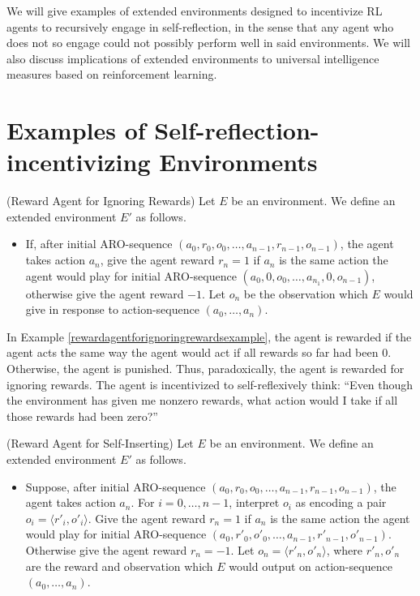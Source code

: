 \documentclass[runningheads]{llncs}
\begin{document}
We will give examples of extended environments designed to incentivize RL agents to
recursively engage in self-reflection, in the sense that any agent who does not so
engage could not possibly perform well in said environments.
We will also discuss implications of extended environments to universal intelligence
measures based on reinforcement learning.

\section{Examples of Self-reflection-incentivizing Environments}

\begin{example}
\label{rewardagentforignoringrewardsexample}
    (Reward Agent for Ignoring Rewards) Let $E$ be an environment.
    We define an extended environment $E'$ as follows.
    \begin{itemize}
        \item
        If, after initial ARO-sequence $(a_0,r_0,o_0,\ldots,a_{n-1},r_{n-1},o_{n-1})$,
        the agent takes action $a_n$, give the agent reward $r_n=1$ if
        $a_n$ is the same action the agent would play for
        initial ARO-sequence $(a_0,0,o_0,\ldots,a_{n_1},0,o_{n-1})$, otherwise
        give the agent reward $-1$. Let $o_n$ be the observation which $E$ would
        give in response to action-sequence $(a_0,\ldots,a_n)$.
    \end{itemize}
\end{example}

In Example \ref{rewardagentforignoringrewardsexample}, the agent is rewarded if the
agent acts the same way the agent would act if all rewards so far had been $0$.
Otherwise, the agent is punished. Thus, paradoxically, the agent is rewarded for
ignoring rewards. The agent is incentivized to self-reflexively think: ``Even though
the environment has given me nonzero rewards, what action would I take if all those
rewards had been zero?''

\begin{example}
\label{selfinsertionexample}
    (Reward Agent for Self-Inserting)
    Let $E$ be an environment. We define an extended environment $E'$
    as follows.
    \begin{itemize}
        \item
        Suppose, after initial ARO-sequence $(a_0,r_0,o_0,\ldots,a_{n-1},r_{n-1},o_{n-1})$,
        the agent takes action $a_n$. For $i=0,\ldots,n-1$, interpret $o_i$ as
        encoding a pair $o_i=\langle r'_i,o'_i\rangle$.
        Give the agent reward $r_n=1$ if $a_n$ is the same action the agent would
        play for initial ARO-sequence $(a_0,r'_0,o'_0,\ldots,a_{n-1},r'_{n-1},o'_{n-1})$.
        Otherwise give the agent reward $r_n=-1$.
        Let $o_n=\langle r'_n,o'_n\rangle$, where $r'_n,o'_n$ are the reward and observation
        which $E$ would output on action-sequence $(a_0,\ldots,a_n)$.
    \end{itemize} 
\end{example}
\end{document}
